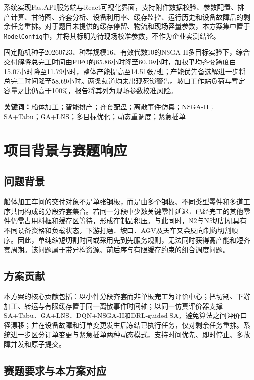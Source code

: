 \documentclass[UTF8,zihao=-4,openany]{ctexrep}
\newcommand{\code}[1]{\texttt{#1}}
\begin{document}
系统实现FastAPI服务端与React可视化界面，支持附件数据校验、参数配置、排产计算、甘特图、齐套分析、设备利用率、缓存监控、运行历史和设备故障后的剩余任务重排。对于题目未提供的缓存停留、物流和现场容量参数，本方案集中置于\code{ModelConfig}中，并将其标明为待现场校准参数，不作为企业实测结论。

固定随机种子20260723、种群规模16、有效代数10的NSGA-II多目标实验下，综合交付解将总完工时间由FIFO的65.86小时降至60.09小时，加权平均齐套跨度由15.07小时降至11.79小时，整体产能提高至14.51张/班；产能优先备选解进一步将总完工时间降至58.69小时。两条轨道均未出现死锁警告。坡口工作站负荷与暂定容量之比仍高于100\%，报告将其列为现场参数校准风险。

\noindent\textbf{关键词：}船体加工；智能排产；齐套配盘；离散事件仿真；NSGA-II；SA+Tabu；GA+LNS；多目标优化；动态重调度；紧急插单

\tableofcontents
\clearpage
{}

\chapter{项目背景与赛题响应}

\section{问题背景}

船体加工车间的交付对象不是单张钢板，而是由多个钢板、不同类型零件和多道工序共同构成的分段齐套集合。若同一分段中少数关键零件延迟，已经完工的其他零件仍需占用料框和缓存区等待，形成在制品积压。与此同时，N2与N5切割机具有不同设备资格和负载状态，下游打磨、坡口、AGV及天车又会反向制约切割顺序。因此，单纯缩短切割时间或采用先到先服务规则，无法同时获得高产能和短齐套周期。该问题属于带异构资源、前后序与有限缓存约束的组合调度问题\cite{pinedo}。

\section{方案贡献}

本方案的核心贡献包括：以小件分段齐套而非单板完工为评价中心；把切割、下游加工、转运与有限缓存置于同一离散事件时间轴；以同一仿真评价器支撑SA+Tabu、GA+LNS、DQN+NSGA-II和DRL-guided SA，避免算法之间评价口径漂移；并在设备故障和订单变更发生后冻结已执行任务，仅对剩余任务重排。系统进一步区分订单变更与紧急插单两种动态模式，支持时间优先、即时停止、多故障并发和原子提交。

\section{赛题要求与本方案对应}
\end{document}
